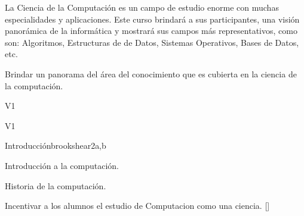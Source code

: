 \begin{syllabus}


\begin{justification}
La Ciencia de la Computación es un campo de estudio enorme con muchas especialidades y aplicaciones. Este curso brindará a sus participantes, una visión panorámica de la informática y mostrará sus campos más representativos, como son: Algoritmos, Estructuras de de Datos, Sistemas Operativos, Bases de Datos, etc.
\end{justification}

\begin{goals}
\item Brindar un panorama del área del conocimiento que es cubierta en la ciencia de la computación.
\end{goals}

\begin{outcomes}{V1}
    \item {}
    \item {}
    \item {}
    \item {}
    \item {}
\end{outcomes}

\begin{competences}{V1}
    \item {} 
    \item {} 
    \item {}
    \item {}
\end{competences}

\begin{unit}{}{Introducción}{brookshear}{2}{a,b}
    \begin{topics}
	\item Introducción a la computación.
	\item Historia de la computación.
   \end{topics}
   \begin{learningoutcomes}
      \item Incentivar a los alumnos el estudio de Computacion como una ciencia. [\Familiarity]
   \end{learningoutcomes}
\end{unit}


\end{syllabus}
